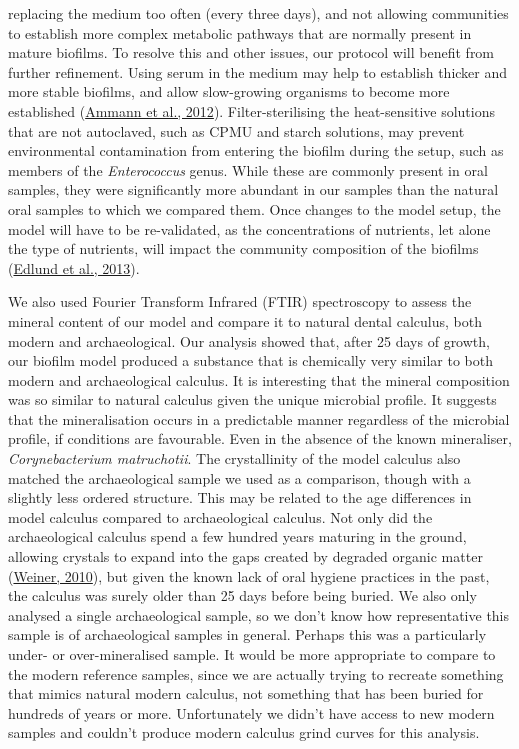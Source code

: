 \documentclass[
  b5paper,
]{book}
\begin{document}
replacing the medium too often (every three days), and not allowing
communities to establish more complex metabolic pathways that are
normally present in mature biofilms. To resolve this and other issues,
our protocol will benefit from further refinement. Using serum in the
medium may help to establish thicker and more stable biofilms, and allow
slow-growing organisms to become more established
(\protect\hyperlink{ref-ammannZurichBiofilm2012}{Ammann et al., 2012}).
Filter-sterilising the heat-sensitive solutions that are not autoclaved,
such as CPMU and starch solutions, may prevent environmental
contamination from entering the biofilm during the setup, such as
members of the \emph{Enterococcus} genus. While these are commonly
present in oral samples, they were significantly more abundant in our
samples than the natural oral samples to which we compared them. Once
changes to the model setup, the model will have to be re-validated, as
the concentrations of nutrients, let alone the type of nutrients, will
impact the community composition of the biofilms
(\protect\hyperlink{ref-edlundBiofilmModel2013}{Edlund et al., 2013}).

We also used Fourier Transform Infrared (FTIR) spectroscopy to assess
the mineral content of our model and compare it to natural dental
calculus, both modern and archaeological. Our analysis showed that,
after 25 days of growth, our biofilm model produced a substance that is
chemically very similar to both modern and archaeological calculus. It
is interesting that the mineral composition was so similar to natural
calculus given the unique microbial profile. It suggests that the
mineralisation occurs in a predictable manner regardless of the
microbial profile, if conditions are favourable. Even in the absence of
the known mineraliser, \emph{Corynebacterium matruchotii}. The
crystallinity of the model calculus also matched the archaeological
sample we used as a comparison, though with a slightly less ordered
structure. This may be related to the age differences in model calculus
compared to archaeological calculus. Not only did the archaeological
calculus spend a few hundred years maturing in the ground, allowing
crystals to expand into the gaps created by degraded organic matter
(\protect\hyperlink{ref-weinerBiologicalMaterials2010}{Weiner, 2010}),
but given the known lack of oral hygiene practices in the past, the
calculus was surely older than 25 days before being buried. We also only
analysed a single archaeological sample, so we don't know how
representative this sample is of archaeological samples in general.
Perhaps this was a particularly under- or over-mineralised sample. It
would be more appropriate to compare to the modern reference samples,
since we are actually trying to recreate something that mimics natural
modern calculus, not something that has been buried for hundreds of
years or more. Unfortunately we didn't have access to new modern samples
and couldn't produce modern calculus grind curves for this analysis.
\end{document}
